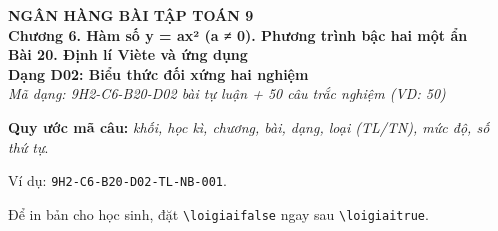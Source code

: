 \documentclass[12pt,a4paper]{article}
\newif\ifloigiai
\begin{document}
\begin{center}
{\Large\textbf{NGÂN HÀNG BÀI TẬP TOÁN 9}}\\[3pt]
\textbf{Chương 6. Hàm số y = ax² (a ≠ 0). Phương trình bậc hai một ẩn}\\[2pt]
\textbf{Bài 20. Định lí Viète và ứng dụng}\\[2pt]
\textbf{Dạng D02: Biểu thức đối xứng hai nghiệm}\\[2pt]
\textit{Mã dạng: 9H2-C6-B20-D02  bài tự luận + 50 câu trắc nghiệm \quad (VD: 50)}
\end{center}
\textbf{Quy ước mã câu:} \textit{khối, học kì, chương, bài, dạng, loại (TL/TN), mức độ, số thứ tự}.\par Ví dụ: \texttt{9H2-C6-B20-D02-TL-NB-001}.\par Để in bản cho học sinh, đặt \verb|\loigiaifalse| ngay sau \verb|\loigiaitrue|.
\end{document}

